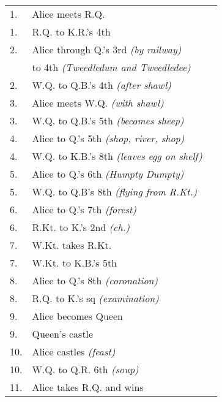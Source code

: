 \begin{tabular}{l l r}
1. & Alice meets R.Q. & \pageref{white1}\\
\hspace{1em} 1. & \hspace{1em}R.Q. to K.R.'s 4th & \pageref{black1} \\
2. & Alice through Q.'s 3rd \textit{(by railway)} & \pageref{white2}\\
& to 4th \textit{(Tweedledum and Tweedledee)} & \pageref{white2b}\\
\hspace{1em} 2. & \hspace{1em}W.Q. to Q.B.'s 4th \textit{(after shawl)} & \pageref{black2}\\
3. & Alice meets W.Q. \textit{(with shawl)} & \pageref{white3}\\
\hspace{1em} 3. & \hspace{1em}W.Q. to Q.B.’s 5th \textit{(becomes sheep)} & \pageref{black3}\\
4. & Alice to Q.'s 5th \textit{(shop, river, shop)} & \pageref{white4}\\
\hspace{1em} 4. &  \hspace{1em}W.Q. to K.B.'s 8th \textit{(leaves egg on shelf)} & \pageref{black4}\\
5. & Alice to Q.'s 6th \textit{(Humpty Dumpty)} & \pageref{white5}\\
\hspace{1em} 5. &  \hspace{1em}W.Q. to Q.B's 8th \textit{(flying from R.Kt.)} & \pageref{black5}\\
6. & Alice to Q.'s 7th \textit{(forest)} & \pageref{white6}\\
\hspace{1em} 6. &  \hspace{1em}R.Kt. to K.'s 2nd \textit{(ch.)} & \pageref{black6}\\
7. & W.Kt. takes R.Kt. & \pageref{white7}\\
\hspace{1em} 7. &  \hspace{1em}W.Kt. to K.B.'s 5th & \pageref{black7}\\
8. & Alice to Q.'s 8th \textit{(coronation)} & \pageref{white8}\\
\hspace{1em} 8. &  \hspace{1em}R.Q. to K.'s sq \textit{(examination)} & \pageref{black8}\\
9. & Alice becomes Queen & \pageref{white9}\\
\hspace{1em} 9. &  \hspace{1em}Queen's castle & \pageref{black9}\\
10. & Alice castles \textit{(feast)} & \pageref{white10}\\
\hspace{1em} 10. &  \hspace{1em}W.Q. to Q.R. 6th \textit{(soup)} & \pageref{black10}\\
11. & Alice takes R.Q. and wins & \pageref{white11}\\
\end{tabular} 
\renewcommand{\arraystretch}{1} %

\vfill
